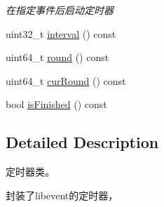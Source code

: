 \begin{DoxyCompactItemize}
\begin{DoxyCompactList}\small\item\em 在指定事件后启动定时器 \end{DoxyCompactList}\item 
uint32\-\_\-t \hyperlink{classec_1_1Timer_af632191a18c3b476fe052404643046c6}{interval} () const 
\item 
uint64\-\_\-t \hyperlink{classec_1_1Timer_ae576336f9adac852fcf1172e0c740960}{round} () const 
\item 
uint64\-\_\-t \hyperlink{classec_1_1Timer_a447daf396b3eade6cdea14912575525a}{cur\-Round} () const 
\item 
bool \hyperlink{classec_1_1Timer_a97095d71c497ae7e47b01bffb9383542}{is\-Finished} () const 
\end{DoxyCompactItemize}


\subsection{Detailed Description}
定时器类。 

封装了libevent的定时器， 

